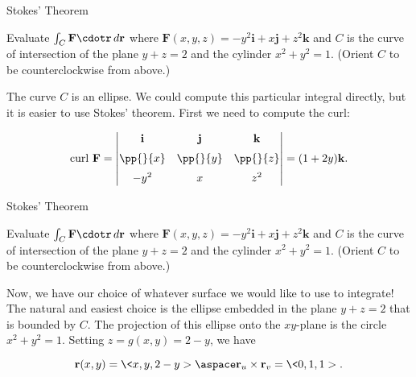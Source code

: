\documentclass[11pt,english,
handout
]{beamer}
\begin{document}
\begin{frame}[t]{Stokes' Theorem}
\small
\begin{example}
Evaluate $\int_C\mathbf{F}\cdotr\,d\mathbf{r}$ where $\mathbf{F}(x,y,z)=-y^2\mathbf{i}+x\mathbf{j}+z^2\mathbf{k}$ and $C$ is the curve of intersection of the plane $y+z=2$ and the cylinder $x^2+y^2=1$. (Orient $C$ to be counterclockwise from above.)

\lspace
The curve $C$ is an ellipse. We could compute this particular integral directly, but it is easier to use Stokes' theorem. \pause First we need to compute the curl:

\[
\text{curl }\mathbf{F}=\begin{vmatrix}\mathbf{i}&\mathbf{j}&\mathbf{k}\\[2mm] \pp{}{x} &\pp{}{y}&\pp{}{z} \\[2mm] -y^2 & x & z^2\end{vmatrix}=(1+2y)\mathbf{k}.
\]
\end{example}
\end{frame}











\begin{frame}[t]{Stokes' Theorem}
\small
\begin{example}
Evaluate $\int_C\mathbf{F}\cdotr\,d\mathbf{r}$ where $\mathbf{F}(x,y,z)=-y^2\mathbf{i}+x\mathbf{j}+z^2\mathbf{k}$ and $C$ is the curve of intersection of the plane $y+z=2$ and the cylinder $x^2+y^2=1$. (Orient $C$ to be counterclockwise from above.)

\lspace
Now, we have our choice of whatever surface we would like to use to integrate! \pause The natural and easiest choice is the ellipse embedded in the plane $y+z=2$ that is bounded by $C$. The projection of this ellipse onto the $xy$-plane is the circle $x^2+y^2=1$. \pause Setting $z=g(x,y)=2-y$, we have

\[
\mathbf{r}(x,y)=\<x,y,2-y>\aspace \mathbf{r}_u\times\mathbf{r}_v=\<0,1,1>.
\]
\end{example}
\end{frame}
\end{document}
